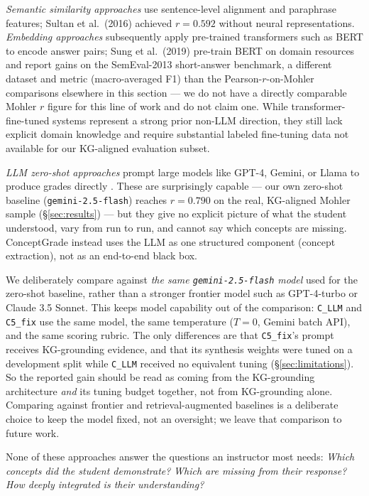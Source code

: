 \documentclass[conference]{IEEEtran}
\begin{document}
\emph{Semantic similarity approaches} \cite{sultan2016} use sentence-level alignment and paraphrase features; Sultan et al.\ (2016) achieved $r = 0.592$ without neural representations. \emph{Embedding approaches} \cite{bert_asag} subsequently apply pre-trained transformers such as BERT \cite{devlin2019} to encode answer pairs; Sung et al.\ (2019) \cite{bert_asag} pre-train BERT on domain resources and report gains on the SemEval-2013 short-answer benchmark, a different dataset and metric (macro-averaged F1) than the Pearson-$r$-on-Mohler comparisons elsewhere in this section --- we do not have a directly comparable Mohler $r$ figure for this line of work and do not claim one. While transformer-fine-tuned systems represent a strong prior non-LLM direction, they still lack explicit domain knowledge and require substantial labeled fine-tuning data not available for our KG-aligned evaluation subset.

\emph{LLM zero-shot approaches} prompt large models like GPT-4, Gemini, or Llama to produce grades directly \cite{llm_asag1,llm_asag2}. These are surprisingly capable --- our own zero-shot baseline (\texttt{gemini-2.5-flash}) reaches $r = 0.790$ on the real, KG-aligned Mohler sample (\S\ref{sec:results}) --- but they give no explicit picture of what the student understood, vary from run to run, and cannot say which concepts are missing. ConceptGrade instead uses the LLM as one structured component (concept extraction), not as an end-to-end black box.

We deliberately compare against \emph{the same \texttt{gemini-2.5-flash} model} used for the zero-shot baseline, rather than a stronger frontier model such as GPT-4-turbo or Claude 3.5 Sonnet. This keeps model capability out of the comparison: \texttt{C\_LLM} and \texttt{C5\_fix} use the same model, the same temperature ($T = 0$, Gemini batch API), and the same scoring rubric. The only differences are that \texttt{C5\_fix}'s prompt receives KG-grounding evidence, and that its synthesis weights were tuned on a development split while \texttt{C\_LLM} received no equivalent tuning (\S\ref{sec:limitations}). So the reported gain should be read as coming from the KG-grounding architecture \emph{and} its tuning budget together, not from KG-grounding alone. Comparing against frontier and retrieval-augmented baselines is a deliberate choice to keep the model fixed, not an oversight; we leave that comparison to future work.

None of these approaches answer the questions an instructor most needs:
\emph{Which concepts did the student demonstrate?}
\emph{Which are missing from their response?}
\emph{How deeply integrated is their understanding?}
\end{document}
